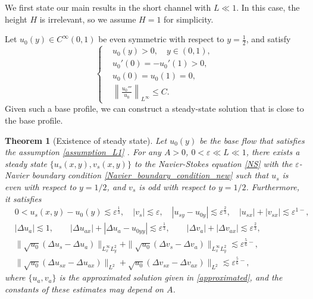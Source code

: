 \documentclass[reqno, 11pt]{amsart}
\theoremstyle{plain}
\newtheorem{theorem}{Theorem}[section]
\theoremstyle{definition}
\theoremstyle{remark}
\numberwithin{equation}{section}
\begin{document}
We first state our main results in the short channel with $L \ll 1$. In this case, the height $H$ is irrelevant, so we assume $H = 1$ for simplicity. 

Let $u_0(y) \in C^\infty(0,1)$ be even symmetric with respect to $y = \frac{1}{2}$, and satisfy
\begin{equation} \label{assumption_L1}
\left\{
\begin{aligned}
&u_0(y) > 0, \quad y \in (0, 1),\\
&u_0'(0) = - u_0'(1) > 0,\\
&u_0(0) = u_0(1) = 0,\\
&\left\|\frac{u_0'''}{u_0}\right\|_{L^\infty} \le C.
\end{aligned}\right.
\end{equation}
Given such a base profile, we can construct a steady-state solution that is close to the base profile.

\begin{theorem}[Existence of steady state]\label{Thm_Existence_L}
Let $u_0(y)$ be the base flow that satisfies the assumption \eqref{assumption_L1} . For any $A > 0$, $0 < \varepsilon \ll L \ll 1$, there exists a steady state $\{ u_s(x,y), v_s(x,y) \}$ to the Navier-Stokes equation \eqref{NS} with the $\varepsilon$-Navier boundary condition \eqref{Navier_boundary_condition_new} such that $u_s$ is even with respect to $y = 1/2$, and $v_s$ is odd with respect to $y = 1/2$. Furthermore, it satisfies
\begin{equation}\label{ss_estimates}
\begin{aligned}
&0 < u_s(x,y) - u_0(y) \lesssim \varepsilon^{\frac{1}{3}}, \quad |v_{s}|  \lesssim \varepsilon, \quad |u_{sy} - u_{0y}| \lesssim \varepsilon^{\frac{2}{3}}, \quad
|u_{sx}| + |v_{sx}|  \lesssim \varepsilon^{1-},\\
& |\Delta u_a| \lesssim 1, \qquad | \Delta u_{ax}| + |\Delta u_a - u_{0yy}| \lesssim \varepsilon^{\frac{1}{3}},  \qquad |\Delta v_a| + |\Delta v_{ax}| \lesssim \varepsilon^{\frac{2}{3}},\\
& \| \sqrt{u_0} (\Delta u_s - \Delta u_a) \|_{L^\infty_x L^2_y} + \| \sqrt{u_0} (\Delta v_s - \Delta v_a) \|_{L^\infty_x L^2_y}    \lesssim \varepsilon^{\frac{5}{6}-},\\
& \| \sqrt{u_0} (\Delta u_{sx} - \Delta u_{ax})  \|_{L^2} + \sqrt{u_0} (\Delta v_{sx} - \Delta v_{ax}) \|_{L^2} \lesssim \varepsilon^{\frac{5}{6}-},
\end{aligned}
\end{equation}
where $\{u_a, v_a\}$ is the approximated solution given in \eqref{approximated}, and the constants of these estimates may depend on $A$.
\end{theorem}
\end{document}
